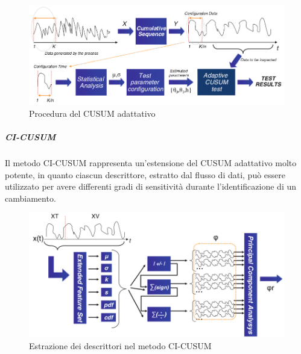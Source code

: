 				\begin{figure}
                                  \centering
                                  \includegraphics[width=12cm,keepaspectratio]{pictures/adaptiveCUSUM}
                                  \caption{Procedura del CUSUM
                                    adattativo}
                                  \label{fig:adaptiveCUSUM}
				\end{figure}
				
				\subparagraph{CI-CUSUM} Il metodo
                                CI-CUSUM rappresenta un'estensione del
                                CUSUM adattativo molto potente, in
                                quanto ciascun descrittore, estratto
                                dal flusso di dati, pu\`o essere
                                utilizzato per avere differenti gradi
                                di sensitivit\`a durante
                                l'identificazione di un cambiamento.
				
				\begin{figure}
                                  \centering
                                  \includegraphics[width=12cm,keepaspectratio]{pictures/CI-CUSUM}
                                  \caption{Estrazione dei descrittori
                                    nel metodo CI-CUSUM}
                                  \label{fig:CI-CUSUM}
				\end{figure}
				
